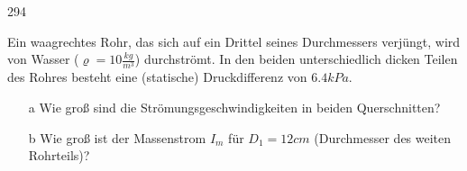 \begin{auf}
    294
\end{auf}
Ein waagrechtes Rohr, das sich auf ein Drittel seines Durchmessers verjüngt, wird von Wasser ($\varrho = 10\frac{kg}{m^3}$) durchströmt. In den beiden unterschiedlich dicken Teilen des Rohres besteht eine (statische) Druckdifferenz von $6.4kPa$.
\begin{enumerate}
    \item[a] Wie groß sind die Strömungsgeschwindigkeiten in beiden Querschnitten?
    \item[b] Wie groß ist der Massenstrom $I_m$ für $D_1=12cm$ (Durchmesser des weiten Rohrteils)?
\end{enumerate}